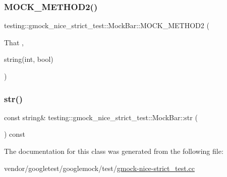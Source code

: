 \subsubsection{\texorpdfstring{M\+O\+C\+K\+\_\+\+M\+E\+T\+H\+O\+D2()}{MOCK\_METHOD2()}}
{\footnotesize\ttfamily testing\+::gmock\+\_\+nice\+\_\+strict\+\_\+test\+::\+Mock\+Bar\+::\+M\+O\+C\+K\+\_\+\+M\+E\+T\+H\+O\+D2 (\begin{DoxyParamCaption}\item[{That}]{,  }\item[{string(int, bool)}]{ }\end{DoxyParamCaption})}

\mbox{\label{classtesting_1_1gmock__nice__strict__test_1_1_mock_bar_a417755a41cb5a75dec7f98bdd951185c}} 
\subsubsection{\texorpdfstring{str()}{str()}}
{\footnotesize\ttfamily const string\& testing\+::gmock\+\_\+nice\+\_\+strict\+\_\+test\+::\+Mock\+Bar\+::str (\begin{DoxyParamCaption}{ }\end{DoxyParamCaption}) const\hspace{0.3cm}{\ttfamily [inline]}}



The documentation for this class was generated from the following file\+:\begin{DoxyCompactItemize}
\item 
vendor/googletest/googlemock/test/\hyperlink{gmock-nice-strict__test_8cc}{gmock-\/nice-\/strict\+\_\+test.\+cc}\end{DoxyCompactItemize}
